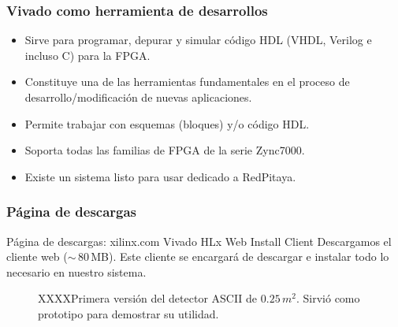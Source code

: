 \documentclass[a4paper,11pt]{article}
\begin{document}
\subsubsection{Vivado como herramienta de desarrollos}
    \begin{itemize}
      \item Sirve para programar, depurar y simular código HDL (VHDL, Verilog e
incluso C) para la FPGA.
      \item Constituye una de las herramientas fundamentales en el proceso de
            desarrollo/modificación de nuevas aplicaciones.
      \item Permite trabajar con esquemas (bloques) y/o código HDL.
      \item Soporta todas las familias de FPGA de la serie Zync7000.
      \item Existe un sistema listo para usar dedicado a RedPitaya.
    \end{itemize}

\subsubsection{Página de descargas}
 Página de descargas: xilinx.com
  Vivado HLx Web Install Client
    Descargamos el cliente web ($\sim$\,80\,MB). Este cliente se encargará de
descargar e instalar todo lo necesario en nuestro sistema.
\begin{figure}[!h]
	\centering				
	\caption{XXXXPrimera versión del detector ASCII de $0.25\,m^2$.
	Sirvió como prototipo para demostrar su utilidad.}
	\label{fig:ASCII1} 
\end{figure}
\end{document}
